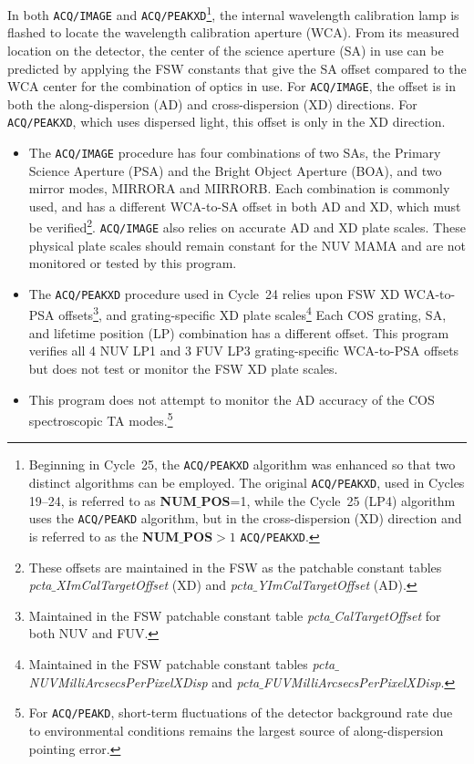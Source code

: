 \documentclass[12pt]{reportj}
\newcommand{\tacq}[1]{\texttt{ACQ/#1}}
\def\numpos{{\bf NUM$\_$POS}\rm}
\begin{document}
In both \tacq{IMAGE} and \tacq{PEAKXD}\footnote{Beginning in Cycle~25, the \tacq{PEAKXD} algorithm was enhanced so that two distinct algorithms can be employed.
The original \tacq{PEAKXD}, used in Cycles 19--24, is referred to as \numpos=1, while the Cycle~25 (LP4) algorithm
uses the \tacq{PEAKD} algorithm, but in the cross-dispersion (XD) direction and is referred to as the \numpos $ > 1$ \tacq{PEAKXD}.},
 the internal wavelength calibration lamp is flashed to locate the wavelength calibration aperture (WCA). From its measured location on the detector, the center of the science aperture (SA) in use can be predicted by applying the FSW constants that give the SA offset compared to the WCA center for the combination of optics in use.
For \tacq{IMAGE}, the offset is in both the along-dispersion (AD) and cross-dispersion (XD) directions. For \tacq{PEAKXD}, which uses dispersed light, this offset is only in the XD direction.
\begin{itemize}
\item{
The \tacq{IMAGE} procedure has four combinations of two SAs, the Primary Science Aperture (PSA) and the Bright Object Aperture (BOA), and two mirror modes, MIRRORA and MIRRORB. Each combination is commonly used, and has a different WCA-to-SA offset in both AD and XD, which must be verified\footnote{These offsets are maintained in the FSW as the patchable constant tables {\it pcta$\_$XImCalTargetOffset} (XD) and {\it pcta$\_$YImCalTargetOffset} (AD).}. \tacq{IMAGE} also relies on accurate AD and XD plate scales. These physical plate scales should remain constant for the NUV MAMA and are not monitored or tested by this program.
}
\item{
The \tacq{PEAKXD} procedure used in Cycle~24 relies upon FSW XD WCA-to-PSA offsets\footnote{Maintained in the FSW patchable constant table {\it pcta$\_$CalTargetOffset} for both NUV and FUV.}, and grating-specific XD plate scales\footnote{Maintained in the FSW patchable constant tables {\it pcta$\_$NUVMilliArcsecsPerPixelXDisp} and {\it pcta$\_$FUVMilliArcsecsPerPixelXDisp}.}
Each COS grating, SA, and lifetime position (LP) combination has a different offset. This program verifies all 4 NUV LP1 and 3 FUV LP3 grating-specific WCA-to-PSA offsets but does not test or monitor the FSW XD plate scales.
}
\item{
This program does not attempt to monitor the AD accuracy of the COS spectroscopic TA modes.\footnote{For \tacq{PEAKD}, short-term fluctuations of the detector background rate due to environmental conditions remains the largest source of along-dispersion pointing error.}
}
\end{itemize}
\end{document}
